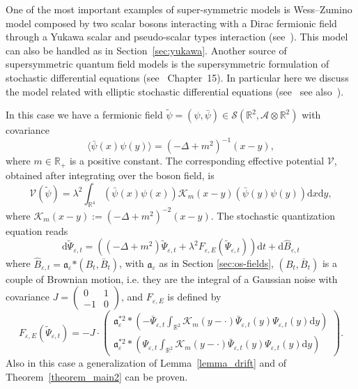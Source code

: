 \documentclass{article}
\newcommand{\assign}{:=}
\newcommand{\asterisk}{\mathord{*}}
\newcommand{\mathd}{\mathrm{d}}
\begin{document}
One of the most important examples of super-symmetric models is Wess--Zumino
model composed by two scalar bosons interacting with a Dirac fermionic field
through a Yukawa scalar and pseudo-scalar types interaction
(see~{\cite{Jaffe_supersymmetry,Arai_supersymmetry,haba_supersymmetry_1995}}).
This model can also be handled as in Section~\ref{sec:yukawa}. Another source
of supersymmetric quantum field models is the supersymmetric formulation of
stochastic differential equations (see~{\cite{ZinnJustin}} Chapter~15). In
particular here we discuss the model related with elliptic stochastic
differential equations
(see~{\cite{klein_supersymmetry_1983,klein_supersymmetry_1985,albeverio_elliptic_2018}}
see also~{\cite{de_vecchi_note_2019}}).

In this case we have a fermionic field $\tilde{\psi} = (\psi, \bar{\psi}) \in
\mathcal{S} (\mathbb{R}^2, \mathcal{A} \otimes \mathbb{R}^2)$ with covariance
\[ \langle \bar{\psi} (x) \psi (y) \rangle = (- \Delta + m^2)^{- 1} (x - y),
\]
where $m \in \mathbb{R}_+$ is a positive constant. The corresponding effective
potential $\mathcal{V}$, obtained after integrating over the boson field, is
\[ \mathcal{V} (\tilde{\psi}) = \lambda^2 \int_{\mathbb{R}^4} (\bar{\psi} (x)
   \psi (x)) \mathcal{K}_m (x - y) (\bar{\psi} (y) \psi (y)) \mathd x \mathd
   y, \]
where $\mathcal{K}_m (x - y) \assign (- \Delta + m^2)^{- 2} (x - y)$. The
stochastic quantization equation reads
\begin{equation}
  \mathd \tilde{\Psi}_{\varepsilon, t} = ((- \Delta + m^2)
  \tilde{\Psi}_{\varepsilon, t} + \lambda^2 F_{\varepsilon, E}
  (\tilde{\Psi}_{\varepsilon, t})) \mathd t + \mathd \hat{B}_{\varepsilon, t}
  \label{eq:elliptic}
\end{equation}
where $\hat{B}_{\varepsilon, t} = \mathfrak{a}_{\varepsilon} \asterisk (B_t,
\bar{B}_t)$, with $\mathfrak{a}_{\varepsilon}$ as in Section
\ref{sec:os-fields}, $(B_t, \bar{B}_t)$ is a couple of Brownian motion, i.e.
they are the integral of a Gaussian noise with covariance $J = \left(
\begin{array}{ll}
  0 & 1\\
  - 1 & 0
\end{array} \right)$, and $F_{\varepsilon, E}$ is defined by
\begin{equation}
  F_{\varepsilon, E} (\tilde{\Psi}_{\varepsilon, t}) = - J \cdot \left(
  \begin{array}{l}
    \mathfrak{a}_{\varepsilon}^{\asterisk 2} \ast \left( -
    \bar{\Psi}_{\varepsilon, t} \int_{\mathbb{R}^2} \mathcal{K}_m (y - \cdot)
    \bar{\Psi}_{\varepsilon, t} (y) \Psi_{\varepsilon, t} (y) \mathd y
    \right)\\
    \mathfrak{a}_{\varepsilon}^{\asterisk 2} \ast \left( \Psi_{\varepsilon, t}
    \int_{\mathbb{R}^2} \mathcal{K}_m (y - \cdot) \bar{\Psi}_{\varepsilon, t}
    (y) \Psi_{\varepsilon, t} (y) \mathd y \right)
  \end{array} \right) . \label{eq:elliptic2}
\end{equation}
Also in this case a generalization of Lemma~\ref{lemma_drift} and of
Theorem~\ref{theorem_main2} can be proven.
\end{document}
